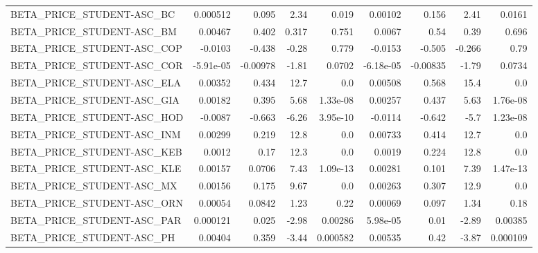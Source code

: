 \begin{tabular}{lrrrrrrrr}
BETA\_PRICE\_STUDENT-ASC\_BC               &    0.000512 &        0.095 &    2.34 &    0.019 &    0.00102 &       0.156 &         2.41 &        0.0161 \\
BETA\_PRICE\_STUDENT-ASC\_BM               &     0.00467 &        0.402 &   0.317 &    0.751 &     0.0067 &        0.54 &         0.39 &         0.696 \\
BETA\_PRICE\_STUDENT-ASC\_COP              &     -0.0103 &       -0.438 &   -0.28 &    0.779 &    -0.0153 &      -0.505 &       -0.266 &          0.79 \\
BETA\_PRICE\_STUDENT-ASC\_COR              &   -5.91e-05 &     -0.00978 &   -1.81 &   0.0702 &  -6.18e-05 &    -0.00835 &        -1.79 &        0.0734 \\
BETA\_PRICE\_STUDENT-ASC\_ELA              &     0.00352 &        0.434 &    12.7 &      0.0 &    0.00508 &       0.568 &         15.4 &           0.0 \\
BETA\_PRICE\_STUDENT-ASC\_GIA              &     0.00182 &        0.395 &    5.68 & 1.33e-08 &    0.00257 &       0.437 &         5.63 &      1.76e-08 \\
BETA\_PRICE\_STUDENT-ASC\_HOD              &     -0.0087 &       -0.663 &   -6.26 & 3.95e-10 &    -0.0114 &      -0.642 &         -5.7 &      1.23e-08 \\
BETA\_PRICE\_STUDENT-ASC\_INM              &     0.00299 &        0.219 &    12.8 &      0.0 &    0.00733 &       0.414 &         12.7 &           0.0 \\
BETA\_PRICE\_STUDENT-ASC\_KEB              &      0.0012 &         0.17 &    12.3 &      0.0 &     0.0019 &       0.224 &         12.8 &           0.0 \\
BETA\_PRICE\_STUDENT-ASC\_KLE              &     0.00157 &       0.0706 &    7.43 & 1.09e-13 &    0.00281 &       0.101 &         7.39 &      1.47e-13 \\
BETA\_PRICE\_STUDENT-ASC\_MX               &     0.00156 &        0.175 &    9.67 &      0.0 &    0.00263 &       0.307 &         12.9 &           0.0 \\
BETA\_PRICE\_STUDENT-ASC\_ORN              &     0.00054 &       0.0842 &    1.23 &     0.22 &    0.00069 &       0.097 &         1.34 &          0.18 \\
BETA\_PRICE\_STUDENT-ASC\_PAR              &    0.000121 &        0.025 &   -2.98 &  0.00286 &   5.98e-05 &        0.01 &        -2.89 &       0.00385 \\
BETA\_PRICE\_STUDENT-ASC\_PH               &     0.00404 &        0.359 &   -3.44 & 0.000582 &    0.00535 &        0.42 &        -3.87 &      0.000109 \\

\end{tabular}
